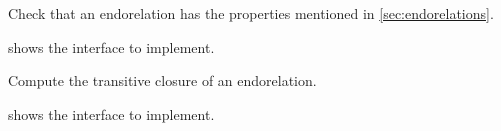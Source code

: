 
\begin{codeexercise}
    Check that an endorelation has the properties mentioned in \cref{sec:endorelations}.

     shows the interface to implement.
\end{codeexercise}


\begin{codeexercise}
    Compute the transitive closure of an endorelation.

     shows the interface to implement.
\end{codeexercise}


